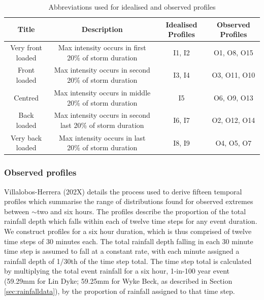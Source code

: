 \documentclass[APA,Times2COL]{WileyNJDv5}
\begin{document}
\begingroup
\setlength{\tabcolsep}{10pt} %
\renewcommand{\arraystretch}{1.5} %
\begin{table}[h!]
\centering
\caption{Abbreviations used for idealised and observed profiles}
\begin{tabular}{cccc} 
 \hline
 \textbf{Title} & \textbf{Description} & \textbf{Idealised Profiles} & \textbf{Observed Profiles} \\ [0.5ex] 
 \hline
 Very front loaded & Max intensity occurs in first 20\% of storm duration & I1, I2 & O1, O8, O15\\
 Front loaded & Max intensity occurs in second 20\% of storm duration & I3, I4 & O3, O11, O10 \\
 Centred & Max intensity occurs in middle 20\% of storm duration & I5 & O6, O9, O13\\
 Back loaded & Max intensity occurs in second last 20\% of storm duration & I6, I7 & O2, O12, O14\\
 Very back loaded & Max intensity occurs in last 20\% of storm duration & I8, I9 & O4, O5, O7\\[1ex] 
 \hline
\end{tabular}
\label{table:profile_names}
\end{table}
\endgroup

\subsubsection{Observed profiles}\label{subsubsec:observed}
Villalobos-Herrera (202X) details the process used to derive fifteen temporal profiles which summarise the range of distributions found for observed extremes between $\sim$two and six hours. The profiles describe the proportion of the total rainfall depth which falls within each of twelve time steps for any event duration. We construct profiles for a six hour duration, which is thus comprised of twelve time steps of 30 minutes each. The total rainfall depth falling in each 30 minute time step is assumed to fall at a constant rate, with each minute assigned a rainfall depth of 1/30th of the time step total. The time step total is calculated by multiplying the total event rainfall for a six hour, 1-in-100 year event (59.29mm for Lin Dyke; 59.25mm for Wyke Beck, as described in Section \ref{sec:rainfalldata}), by the proportion of rainfall assigned to that time step.  
\end{document}
